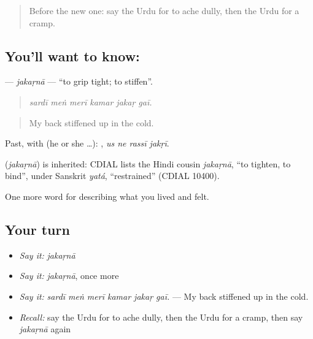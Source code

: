 \label{lesson:UR-C473-jakarna}



\begin{quote}
Before the new one: say the Urdu for to ache dully, then the Urdu for a cramp.
\end{quote}

\subsection*{You'll want to know: }
\textbf{} — \emph{jakaṛnā} — \textquotedblleft{}to grip tight; to stiffen\textquotedblright{}.

\begin{quote}
     
\end{quote}

\begin{quote}
\emph{sardī meṅ merī kamar jakaṛ gaī.}
\end{quote}

\begin{quote}
My back stiffened up in the cold.
\end{quote}

Past, with  (he or she …):    , \emph{us ne rassī jakṛī}.

\begin{cousinweb}
\textbf{} (\emph{jakaṛnā}) is inherited: CDIAL lists the Hindi cousin \emph{jakaṛnā}, \textquotedblleft{}to tighten, to bind\textquotedblright{}, under Sanskrit \emph{yatá}, \textquotedblleft{}restrained\textquotedblright{} (CDIAL 10400).
\end{cousinweb}

\begin{grammarlens}[title={What you've built}]
One more word for describing what you lived and felt.
\end{grammarlens}

\subsection*{Your turn}
\begin{itemize}
\raggedright
  \item \emph{Say it:} \emph{jakaṛnā}
  \item \emph{Say it:} \emph{jakaṛnā}, once more
  \item \emph{Say it:} \emph{sardī meṅ merī kamar jakaṛ gaī.} — My back stiffened up in the cold.
  \item \emph{Recall:} say the Urdu for to ache dully, then the Urdu for a cramp, then say \emph{jakaṛnā} again
\end{itemize}


